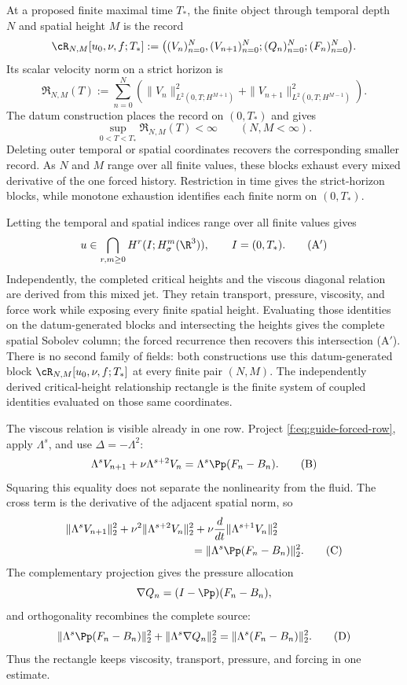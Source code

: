 \label{f:guide:intersection}
At a proposed finite maximal time \(T_*\), the finite object through temporal
depth \(N\) and spatial height \(M\) is the record
\[
 \cR_{N,M}[u_0,\nu,f;T_*]
 :=\bigl((V_n)_{n=0}^{N},(V_{n+1})_{n=0}^{N};
         (Q_n)_{n=0}^{N};(F_n)_{n=0}^{N}\bigr).
\]
Its scalar velocity norm on a strict horizon is
\[
 \mathfrak R_{N,M}(T)
 :=\sum_{n=0}^{N}\left(
 \|V_n\|_{L^2(0,T;H^{M+1})}^2
 +\|V_{n+1}\|_{L^2(0,T;H^{M-1})}^2\right).
\]
The datum construction places the record on \((0,T_*)\) and gives
\[
 \sup_{0<T<T_*}\mathfrak R_{N,M}(T)<\infty
 \qquad(N,M<\infty).
 \tag{A}
\]
Deleting outer temporal or spatial coordinates recovers the corresponding
smaller record.  As \(N\) and \(M\) range over all finite values, these blocks
exhaust every mixed derivative of the one forced history.  Restriction in time
gives the strict-horizon blocks, while monotone exhaustion identifies each
finite norm on \((0,T_*)\).

Letting the temporal and spatial indices range over all finite values gives
\[
 u\in\bigcap_{r,m\ge0}H^r(I;H^m_\sigma(\R^3)),
 \qquad I=(0,T_*).
 \tag{A$'$}
\]
Independently, the completed critical heights and the viscous diagonal relation
are derived from this mixed jet.  They retain transport, pressure,
viscosity, and force work while exposing every finite spatial height.
Evaluating those identities on the datum-generated blocks and intersecting the
heights gives the complete spatial Sobolev column; the forced recurrence then
recovers this intersection (A$'$).
There is no second family of fields: both constructions use this
datum-generated block \(\cR_{N,M}[u_0,\nu,f;T_*]\) at every finite pair
\((N,M)\).  The independently derived critical-height relationship rectangle
is the finite system of coupled identities evaluated on those same
coordinates.

The viscous relation is visible already in one row.  Project
\eqref{f:eq:guide-forced-row}, apply \(\Lambda^s\), and use
\(\Delta=-\Lambda^2\):
\[
 \Lambda^sV_{n+1}+\nu\Lambda^{s+2}V_n
 =\Lambda^s\Pp(F_n-B_n).
 \tag{B}
\]
Squaring this equality does not separate the nonlinearity from the fluid.
The cross term is the derivative of the adjacent spatial norm, so
\begin{align}
 &\|\Lambda^sV_{n+1}\|_2^2
 +\nu^2\|\Lambda^{s+2}V_n\|_2^2
 +\nu\frac{d}{dt}\|\Lambda^{s+1}V_n\|_2^2
 \notag\\
 &\hspace{4cm}
 =\|\Lambda^s\Pp(F_n-B_n)\|_2^2.
 \tag{C}
\end{align}
The complementary projection gives the pressure allocation
\[
 \nabla Q_n=(I-\Pp)(F_n-B_n),
\]
and orthogonality recombines the complete source:
\[
 \|\Lambda^s\Pp(F_n-B_n)\|_2^2
 +\|\Lambda^s\nabla Q_n\|_2^2
 =\|\Lambda^s(F_n-B_n)\|_2^2.
 \tag{D}
\]
Thus the rectangle keeps viscosity, transport, pressure, and forcing in one estimate.

